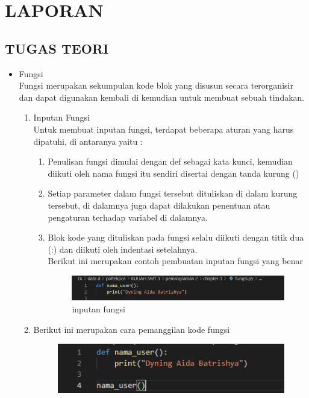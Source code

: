 \chapter{LAPORAN}
\section{TUGAS TEORI}
\begin{itemize}
	\item Fungsi\\
	Fungsi merupakan sekumpulan kode blok yang disusun secara terorganisir dan dapat digunakan kembali di kemudian untuk membuat sebuah tindakan. 
	\begin{enumerate}
	\item Inputan Fungsi\\
		Untuk membuat inputan fungsi, terdapat beberapa aturan yang harus dipatuhi, di antaranya yaitu :\\
		\begin{enumerate}
		\item Penulisan fungsi dimulai dengan def sebagai kata kunci, kemudian diikuti oleh nama fungsi itu sendiri disertai dengan tanda kurung ()
		\item Setiap parameter dalam fungsi tersebut dituliskan di dalam kurung tersebut, di dalamnya juga dapat dilakukan penentuan atau pengaturan terhadap variabel di dalamnya.
		\item Blok kode yang dituliskan pada fungsi selalu diikuti dengan titik dua (:) dan diikuti oleh indentasi setelahnya.\\
		Berikut ini merupakan contoh pembuatan inputan fungsi yang benar
		        \begin{figure}[H]
				\includegraphics[width=20cm]{figures/1184030/fungsi/input.PNG}
				\centering
				\caption{inputan fungsi}
				\end{figure}
		\end{enumerate}
		\item Berikut ini merupakan cara pemanggilan kode fungsi
		        \begin{figure}[H]
				\includegraphics[width=20cm]{figures/1184030/fungsi/panggil.PNG}

\end{figure}
\end{enumerate}
\end{itemize}
